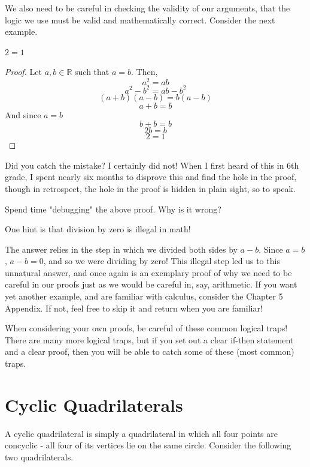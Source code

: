 We also need to be careful in checking the validity of our arguments, that the logic we use must be valid and mathematically correct. Consider the next example.
\begin{example}
$2 = 1$
\end{example}
\begin{proof}
Let $a, b \in \mathbb{R}$ such that $a = b$. Then,
\[
a^2 = ab
\]
\[
a^2-b^2 = ab-b^2
\]
\[
(a+b)(a-b) = b(a-b)
\]
\[
a+b = b
\]
And since $a = b$
\[
b + b = b
\]
\[
2b = b
\]
\[
2 = 1
\]
\end{proof}
Did you catch the mistake? I certainly did not! When I first heard of this in 6th grade, I spent nearly six months to disprove this and find the hole in the proof, though in retrospect, the hole in the proof is hidden in plain sight, so to speak.

\begin{exercise}
    Spend time  "debugging" the above proof. Why is it wrong?
\end{exercise}

One hint is that division by zero is illegal in math! 

The answer relies in the step in which we divided both sides by $a-b$. Since $a = b$, $a-b = 0$, and so we were dividing by zero! This illegal step led us to this unnatural answer, and once again is an exemplary proof of why we need to be careful in our proofs just as we would be careful in, say, arithmetic. If you want yet another example, and are familiar with calculus, consider the Chapter 5 Appendix. If not, feel free to skip it and return when you are familiar!

When considering your own proofs, be careful of these common logical traps! There are many more logical traps, but if you set out a clear if-then statement and a clear proof, then you will be able to catch some of these (most common) traps.

\section{Cyclic Quadrilaterals}
A cyclic quadrilateral is simply a quadrilateral in which all four points are concyclic - all four of its vertices lie on the same circle. Consider the following two quadrilaterals. 

